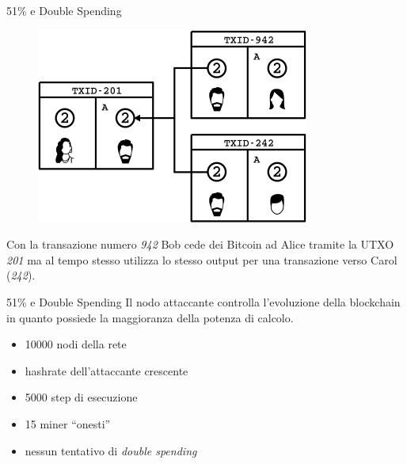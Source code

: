 \documentclass{beamer}
\begin{document}
\begin{frame}{51\% e Double Spending}
	\begin{figure}
		\centering
        \includegraphics[width=0.6\linewidth]{./images/double_spending.png}
	\end{figure}
    Con la transazione numero \emph{942} Bob cede dei Bitcoin ad Alice tramite la UTXO \emph{201} ma al tempo stesso utilizza lo stesso output per una transazione verso Carol (\emph{242}).
\end{frame}

\begin{frame}{51\% e Double Spending}
	Il nodo attaccante controlla l'evoluzione della blockchain in quanto possiede la maggioranza della potenza di calcolo.
    
    \begin{itemize}
    	\item 10000 nodi della rete
        \item hashrate dell'attaccante crescente
        \item 5000 step di esecuzione
        \item 15 miner ``onesti''
        \item nessun tentativo di \textit{double spending}
    \end{itemize}
\end{frame}

%            
\end{document}
